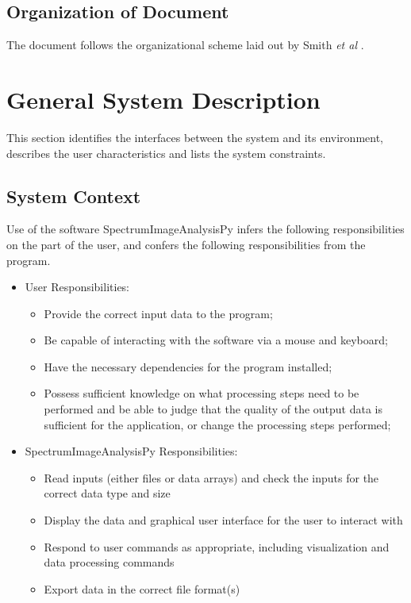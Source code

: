 \documentclass[12pt]{article}
\newcommand{\progname}{SpectrumImageAnalysisPy} %
\begin{document}
\subsection{Organization of Document}

The document follows the organizational scheme laid out by Smith \textit{et al} \cite{SmithAndLai2005, smith_requirements_2007}.

\section{General System Description}

This section identifies the interfaces between the system and its environment,
describes the user characteristics and lists the system constraints.

\subsection{System Context}

Use of the software \progname{} infers the following responsibilities on the part of the user, and confers the following responsibilities from the program.

\begin{itemize}
	\item User Responsibilities:
	\begin{itemize}
		\item Provide the correct input data to the program;
		\item Be capable of interacting with the software via a mouse and keyboard;
		\item Have the necessary dependencies for the program installed;
		\item Possess sufficient knowledge on what processing steps need to be performed and be able to judge that the quality of the output data is sufficient for the application, or change the processing steps performed;
	\end{itemize}
	\item \progname{} Responsibilities:
	\begin{itemize}
		\item Read inputs (either files or data arrays) and check the inputs for the correct data type and size
		\item Display the data and graphical user interface for the user to interact with
		\item Respond to user commands as appropriate, including visualization and data processing commands
		\item Export data in the correct file format(s)
	\end{itemize}
\end{itemize}
\end{document}
